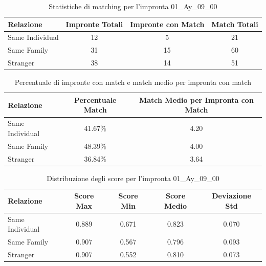 \begin{table}[htbp]
\centering
\caption{Statistiche di matching per l'impronta 01\_Ay\_09\_00}
\label{tab:results_01_Ay_09_00}
\begin{tabular}{|l|c|c|c|}
\hline
\textbf{Relazione} & \textbf{Impronte Totali} & \textbf{Impronte con Match} & \textbf{Match Totali} \\
\hline
Same Individual & 12 & 5 & 21 \\
\hline
Same Family & 31 & 15 & 60 \\
\hline
Stranger & 38 & 14 & 51 \\
\hline
\end{tabular}
\end{table}


\begin{table}[htbp]
\centering
\caption{Percentuale di impronte con match e match medio per impronta con match}
\label{tab:match_percentage_01_Ay_09_00}
\begin{tabular}{|l|c|c|}
\hline
\textbf{Relazione} & \textbf{Percentuale Match} & \textbf{Match Medio per Impronta con Match} \\
\hline
Same Individual & 41.67\% & 4.20 \\
\hline
Same Family & 48.39\% & 4.00 \\
\hline
Stranger & 36.84\% & 3.64 \\
\hline
\end{tabular}
\end{table}


\begin{table}[htbp]
\centering
\caption{Distribuzione degli score per l'impronta 01\_Ay\_09\_00}
\label{tab:scores_01_Ay_09_00}
\begin{tabular}{|l|c|c|c|c|}
\hline
\textbf{Relazione} & \textbf{Score Max} & \textbf{Score Min} & \textbf{Score Medio} & \textbf{Deviazione Std} \\
\hline
Same Individual & 0.889 & 0.671 & 0.823 & 0.070 \\
\hline
Same Family & 0.907 & 0.567 & 0.796 & 0.093 \\
\hline
Stranger & 0.907 & 0.552 & 0.810 & 0.073 \\
\hline
\end{tabular}
\end{table}

